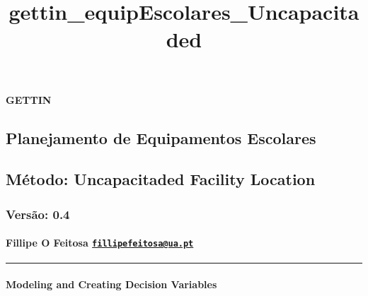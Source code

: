 \documentclass[11pt]{article}
\title{gettin\_equipEscolares\_Uncapacitaded}
\begin{document}
    
    
    \maketitle
    
    

    
    \paragraph{GETTIN}\label{gettin}

\subsection{Planejamento de Equipamentos
Escolares}\label{planejamento-de-equipamentos-escolares}

\subsection{Método: Uncapacitaded Facility
Location}\label{muxe9todo-uncapacitaded-facility-location}

\subsubsection{Versão: 0.4}\label{versuxe3o-0.4}

\paragraph{\texorpdfstring{Fillipe O Feitosa
\href{mailto:fillipefeitosa@ua.pt}{\nolinkurl{fillipefeitosa@ua.pt}}}{Fillipe O Feitosa fillipefeitosa@ua.pt}}\label{fillipe-o-feitosa-fillipefeitosaua.pt}

\begin{center}\rule{0.5\linewidth}{\linethickness}\end{center}

    \paragraph{Modeling and Creating Decision
Variables}\label{modeling-and-creating-decision-variables}
\end{document}
